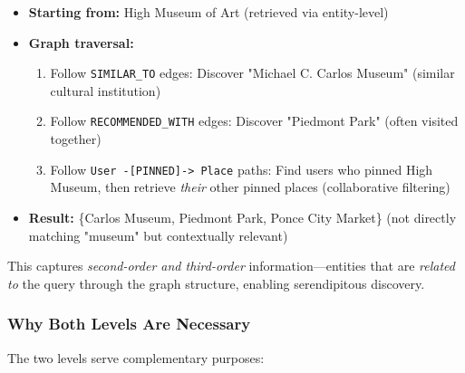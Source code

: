 \documentclass{article} %
\begin{document}
\begin{itemize}
    \item \textbf{Starting from:} High Museum of Art (retrieved via entity-level)
    \item \textbf{Graph traversal:}
    \begin{enumerate}
        \item Follow \texttt{SIMILAR\_TO} edges: Discover "Michael C. Carlos Museum" (similar cultural institution)
        \item Follow \texttt{RECOMMENDED\_WITH} edges: Discover "Piedmont Park" (often visited together)
        \item Follow \texttt{User -[PINNED]-> Place} paths: Find users who pinned High Museum, then retrieve \textit{their} other pinned places (collaborative filtering)
    \end{enumerate}
    \item \textbf{Result:} \{Carlos Museum, Piedmont Park, Ponce City Market\} (not directly matching "museum" but contextually relevant)
\end{itemize}

This captures \textit{second-order and third-order} information—entities that are \textit{related to} the query through the graph structure, enabling serendipitous discovery.

\subsubsection{Why Both Levels Are Necessary}

The two levels serve complementary purposes:
\end{document}
